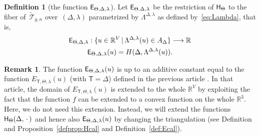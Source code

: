 \documentclass[a4paper, 11pt]{article}
\newcommand{\R}{\mathbb{R}}
\newcommand{\Teich}{\mathcal{T}}
\newcommand{\decTeich}{\widetilde{\Teich}}
\newcommand{\Hsf}{\scalebox{0.94}{$\mathsf{H}$}}
\newcommand{\Esf}{\scalebox{0.94}{$\mathsf{E}$}}
\theoremstyle{plain}
\theoremstyle{definition}
\newtheorem{definition}[theorem]{Definition}
\newtheorem{remark}[theorem]{Remark}
\begin{document}
\begin{definition}[the function $\Esf_{\Theta,\Delta,\lambda}$]
  \label{def:Esf}
  Let $\Esf_{\Theta,\Delta,\lambda}$ be the restriction of
  $\Hsf_{\Theta}$ to the fiber of~$\decTeich_{g,n}$
  over~$(\Delta,\lambda)$ parametrized by $\Lambda^{\Delta,\lambda}$
  as defined by~\eqref{eq:Lambda}, that is,
  \begin{gather}
    \notag
    \Esf_{\Theta,\Delta,\lambda}:
    \{u\in\R^{V}\,|\, \Lambda^{\Delta,\lambda}(u)\in A_{\Delta}\}
    \longrightarrow\R\\
      \Esf_{\Theta,\Delta,\lambda}(u)=H(\Delta,\Lambda^{\Delta,\lambda}(u)).
    \label{eq:Esf}
  \end{gather}
\end{definition}

\begin{remark}
  \label{rem:Esf}
  The function $\Esf_{\Theta,\Delta,\lambda}(u)$ is up to an additive
  constant equal to the function $E_{\mathsf{T},\Theta,\lambda}(u)$
  (with $\mathsf{T}=\Delta$) defined in the previous article
  \cite[eq.~(4-6)]{bobenko15}. In that article, the domain of
  $E_{\mathsf{T},\Theta,\lambda}(u)$ is extended to the whole $\R^{V}$
  by exploiting the fact that the function $f$ can be extended to a
  convex function on the whole $\R^{3}$. Here, we do not need this
  extension. Instead, we will extend the functions
  $\Hsf_{\Theta}(\Delta,\,\cdot\,)$ and hence also
  $\Esf_{\Theta,\Delta,\lambda}(u)$ by changing the triangulation
  (see Definition and Proposition~\ref{defprop:Hcal} and
  Definition~\ref{def:Ecal}).
\end{remark}
\end{document}
